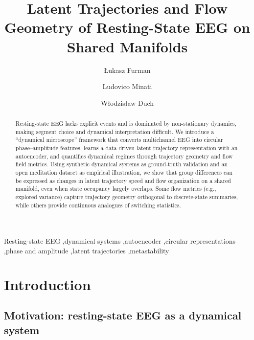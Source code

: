 \documentclass[5p,twocolumn,authoryear]{elsarticle}
\begin{document}
\begin{frontmatter}

\title{Latent Trajectories and Flow Geometry of Resting-State EEG on Shared Manifolds}

\author[1]{Łukasz Furman}
\author[2,3]{Ludovico Minati}
\author[1]{Włodzisław Duch}

\address[1]{Faculty of Physics, Astronomy and Informatics, Nicolaus Copernicus University, 87-100, Toruń, Poland}
\address[2]{School of Life Science and Technology, University of Electronic Science and Technology of China, 611731 Chengdu, China}
\address[3]{Center for Mind/Brain Sciences (CIMeC), University of Trento, 38123 Trento, Italy}


\begin{abstract}
Resting-state EEG lacks explicit events and is dominated by non-stationary dynamics, making segment choice and dynamical interpretation difficult.
We introduce a ``dynamical microscope'' framework that converts multichannel EEG into circular phase--amplitude features, learns a data-driven latent trajectory representation with an autoencoder, and quantifies dynamical regimes through trajectory geometry and flow field metrics.
Using synthetic dynamical systems as ground-truth validation and an open meditation dataset as empirical illustration, we show that group differences can be expressed as changes in latent trajectory speed and flow organization on a shared manifold, even when state occupancy largely overlaps.
Some flow metrics (e.g., explored variance) capture trajectory geometry orthogonal to discrete-state summaries, while others provide continuous analogues of switching statistics.
\end{abstract}

\begin{keyword}
Resting-state EEG \sep dynamical systems \sep autoencoder \sep circular representations \sep phase and amplitude \sep latent trajectories \sep metastability
\end{keyword}

\end{frontmatter}

\section{Introduction}

\subsection{Motivation: resting-state EEG as a dynamical system}
\end{document}
